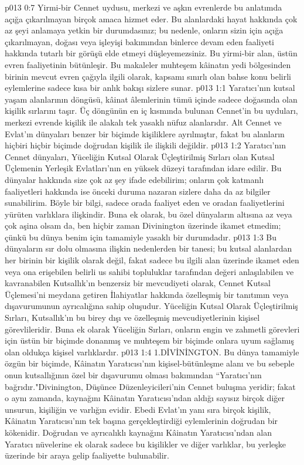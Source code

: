 \vs p013 0:7 Yirmi\hyp{}bir Cennet uydusu, merkezi ve aşkın evrenlerde bu anlatımda açığa çıkarılmayan birçok amaca hizmet eder. Bu alanlardaki hayat hakkında çok az şeyi anlamaya yetkin bir durumdasınız; bu nedenle, onların sizin için açığa çıkarılmayan, doğası veya işleyişi bakımından binlerce devam eden faaliyeti hakkında tutarlı bir görüşü elde etmeyi düşleyemezsiniz. Bu yirmi\hyp{}bir alan, üstün evren faaliyetinin  bütünleşir. Bu makaleler muhteşem kâinatın yedi bölgesinden birinin mevcut evren çağıyla ilgili olarak, kapsamı sınırlı olan bahse konu belirli eylemlerine sadece kısa bir anlık bakışı sizlere sunar.
\vs p013 1:1 Yaratıcı’nın kutsal yaşam alanlarının döngüsü, kâinat âlemlerinin tümü içinde sadece doğasında olan kişilik sırlarını taşır. Üç döngünün en iç kısmında bulunan Cennet’in bu uyduları, merkezi evrende kişilik ile alakalı tek yasaklı nüfuz alanlarıdır. Alt Cennet ve Evlat’ın dünyaları benzer bir biçimde kişiliklere ayrılmıştır, fakat bu alanların hiçbiri hiçbir biçimde doğrudan kişilik ile ilişkili değildir.
\vs p013 1:2 Yaratıcı’nın Cennet dünyaları, Yüceliğin Kutsal Olarak Üçleştirilmiş Sırları olan Kutsal Üçlemenin Yerleşik Evlatları’nın en yüksek düzeyi tarafından idare edilir. Bu dünyalar hakkında size çok az şey ifade edebilirim; onların çok katmanlı faaliyetleri hakkında ise önceki duruma nazaran sizlere daha da az bilgiler sunabilirim. Böyle bir bilgi, sadece orada faaliyet eden ve oradan faaliyetlerini yürüten varlıklara ilişkindir. Buna ek olarak, bu özel dünyaların altısına az veya çok aşina olsam da, ben hiçbir zaman Divinington üzerinde ikamet etmedim; çünkü bu dünya benim için tamamiyle yasaklı bir durumdadır.
\vs p013 1:3 Bu dünyaların sır dolu olmasına ilişkin nedenlerden bir tanesi; bu kutsal alanlardan her birinin bir kişilik olarak değil, fakat sadece bu ilgili alan üzerinde ikamet eden veya ona erişebilen belirli us sahibi topluluklar tarafından değeri anlaşılabilen ve kavranabilen Kutsallık’ın benzersiz bir mevcudiyeti olarak, Cennet Kutsal Üçlemesi’ni meydana getiren İlahiyatlar hakkında özelleşmiş bir tanıtımın veya dışavurumunun ayrıcalığına sahip oluşudur. Yüceliğin Kutsal Olarak Üçleştirilmiş Sırları, Kutsallık’ın bu birey dışı ve özelleşmiş mevcudiyetlerinin kişisel görevlileridir. Buna ek olarak Yüceliğin Sırları, onların engin ve zahmetli görevleri için üstün bir biçimde donanmış ve muhteşem bir biçimde onlara uyum sağlamış olan oldukça kişisel varlıklardır.
\vs p013 1:4 1.\bibnobreakspace DİVİNİNGTON. Bu dünya tamamiyle özgün bir biçimde, Kâinatın Yaratıcısı’nın kişisel\hyp{}bütünleşme alanı ve bu sebeple onun kutsallığının özel bir dışavurumu olması bakımından “Yaratıcı’nın bağrıdır."Divinington, Düşünce Düzenleyicileri’nin Cennet buluşma yeridir; fakat o aynı zamanda, kaynağını Kâinatın Yaratıcısı’ndan aldığı sayısız birçok diğer unsurun, kişiliğin ve varlığın evidir. Ebedi Evlat’ın yanı sıra birçok kişilik, Kâinatın Yaratıcısı’nın tek başına gerçekleştirdiği eylemlerinin doğrudan bir kökenidir. Doğrudan ve ayrıcalıklı kaynağını Kâinatın Yaratıcısı’ndan alan Yaratıcı nüvelerine ek olarak sadece bu kişilikler ve diğer varlıklar, bu yerleşke üzerinde bir araya gelip faaliyette bulunabilir.
